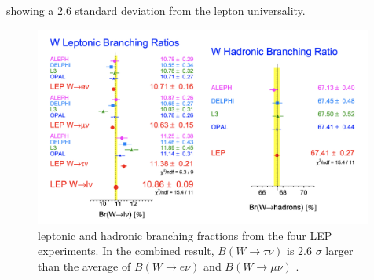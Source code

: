\noindent showing a 2.6 standard deviation from the lepton universality.


\begin{figure}[ht]
    \centering
    \includegraphics[width=0.99\textwidth]{chapters/RelatedWorks/sectionLU/figures/lepResult.png}
    \caption{\PW leptonic and hadronic branching fractions from the four LEP experiments. In the combined result, $B(W\to \tau \nu)$  is 2.6 $\sigma$ larger than the average of $B(W\to e \nu)$ and $B(W\to \mu \nu)$ \cite{Schael:2013ita}. }
    \label{fig:relatedWorks:lu:W:lep}
\end{figure}


